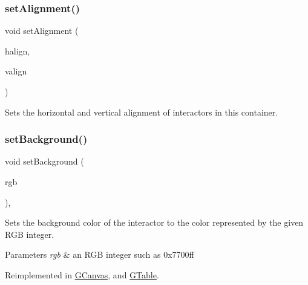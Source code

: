 \subsubsection{\texorpdfstring{set\+Alignment()}{setAlignment()}}
{\footnotesize\ttfamily void set\+Alignment (\begin{DoxyParamCaption}\item[{\mbox{\hyperlink{namespacesgl_aa00e70829e72ff16addc4d9f06fe3bc5}{Horizontal\+Alignment}}}]{halign,  }\item[{\mbox{\hyperlink{namespacesgl_a9c2ed22cfbd21f13df24ea193b310aee}{Vertical\+Alignment}}}]{valign }\end{DoxyParamCaption})\hspace{0.3cm}{\ttfamily [virtual]}}



Sets the horizontal and vertical alignment of interactors in this container. 

\mbox{\label{classsgl_1_1GInteractor_acba7e546c2025c0a15ca4b4cc92043db}} 
\subsubsection{\texorpdfstring{set\+Background()}{setBackground()}\hspace{0.1cm}{\footnotesize\ttfamily [1/2]}}
{\footnotesize\ttfamily void set\+Background (\begin{DoxyParamCaption}\item[{int}]{rgb }\end{DoxyParamCaption})\hspace{0.3cm}{\ttfamily [virtual]}, {\ttfamily [inherited]}}



Sets the background color of the interactor to the color represented by the given R\+GB integer. 


\begin{DoxyParams}{Parameters}
{\em rgb} & an R\+GB integer such as 0x7700ff \\
\hline
\end{DoxyParams}


Reimplemented in \mbox{\hyperlink{classsgl_1_1GCanvas_a10d305826534b55561ea88730fc9f6cd}{G\+Canvas}}, and \mbox{\hyperlink{classsgl_1_1GTable_aefbd30fa3e699d49b6dd2c2a2d6e8c2b}{G\+Table}}.

